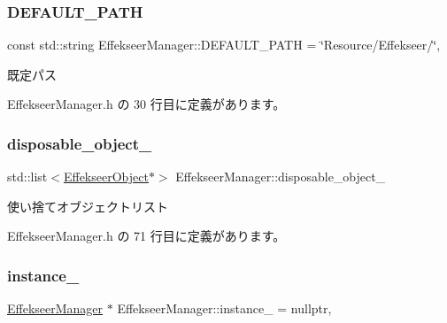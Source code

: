\subsubsection{\texorpdfstring{D\+E\+F\+A\+U\+L\+T\+\_\+\+P\+A\+TH}{DEFAULT\_PATH}}
{\footnotesize\ttfamily const std\+::string Effekseer\+Manager\+::\+D\+E\+F\+A\+U\+L\+T\+\_\+\+P\+A\+TH = \char`\"{}Resource/Effekseer/\char`\"{}\hspace{0.3cm}{\ttfamily [static]}, {\ttfamily [private]}}



既定パス 



 Effekseer\+Manager.\+h の 30 行目に定義があります。

\mbox{\label{class_effekseer_manager_ad331be04d762bbc7619999a0947c306a}} 
\subsubsection{\texorpdfstring{disposable\+\_\+object\+\_\+}{disposable\_object\_}}
{\footnotesize\ttfamily std\+::list$<$\mbox{\hyperlink{class_effekseer_object}{Effekseer\+Object}}$\ast$$>$ Effekseer\+Manager\+::disposable\+\_\+object\+\_\+\hspace{0.3cm}{\ttfamily [private]}}



使い捨てオブジェクトリスト 



 Effekseer\+Manager.\+h の 71 行目に定義があります。

\mbox{\label{class_effekseer_manager_afc6d832b282eab2d2c6f89a889b11706}} 
\subsubsection{\texorpdfstring{instance\+\_\+}{instance\_}}
{\footnotesize\ttfamily \mbox{\hyperlink{class_effekseer_manager}{Effekseer\+Manager}} $\ast$ Effekseer\+Manager\+::instance\+\_\+ = nullptr\hspace{0.3cm}{\ttfamily [static]}, {\ttfamily [private]}}



